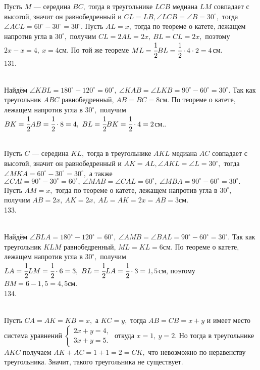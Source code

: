Пусть $M$ --- середина $BC,$ тогда в треугольнике $LCB$ медиана $LM$ совпадает с высотой, значит он равнобедренный и  $CL=LB, \angle LCB=\angle B=30^\circ,$ тогда $\angle ACL=60^\circ-30^\circ=30^\circ.$ Пусть $AL=x,$ тогда по теореме о катете, лежащем напротив угла в $30^\circ,$ получим $CL=2AL=2x,\ BL=CL=2x,$ поэтому $2x-x=4,\ x=4$см. По той же теореме $ML=\cfrac{1}{2}BL=\cfrac{1}{2}\cdot4\cdot2=4$см.\\
131. \begin{figure}[ht!]
\end{figure}\\
Найдём $\angle KBL=180^\circ-120^\circ=60^\circ,\ \angle KAB=\angle LKB=90^\circ-60^\circ=30^\circ.$ Так как треугольник $ABC$ равнобедренный, $AB=BC=8$см. По теореме о катете, лежащем напротив угла в $30^\circ,$ получим $BK=\cfrac{1}{2}AB=\cfrac{1}{2}\cdot8=4,\ BL=\cfrac{1}{2}BK=\cfrac{1}{2}\cdot4=2$см.\newpage{}. \begin{figure}[ht!]
\end{figure}\\
Пусть $C$ --- середина $KL,$ тогда в треугольнике $AKL$ медиана $AC$ совпадает с высотой, значит он равнобедренный и  $AK=AL, \angle AKL=\angle L=30^\circ,$ тогда $\angle MKA=60^\circ-30^\circ=30^\circ,$ а также $\angle CAl=90^\circ-30^\circ=60^\circ,\ \angle MAB=\angle CAL=60^\circ,\ \angle MBA=90^\circ-60^\circ=30^\circ.$
Пусть $AM=x,$ тогда по теореме о катете, лежащем напротив угла в $30^\circ,$ получим $AB=2x,\ AK=2x,\ AL=AK=2x=AB=3$см.\\
133. \begin{figure}[ht!]
\end{figure}\\
Найдём $\angle BLA=180^\circ-120^\circ=60^\circ,\ \angle AMB=\angle BAL=90^\circ-60^\circ=30^\circ.$ Так как треугольник $KLM$ равнобедренный, $ML=KL=6$см. По теореме о катете, лежащем напротив угла в $30^\circ,$ получим $LA=\cfrac{1}{2}LM=\cfrac{1}{2}\cdot6=3,\ BL=\cfrac{1}{2}LA=\cfrac{1}{2}\cdot3=1,5$см, поэтому $BM=6-1,5=4,5$см.\\
134. \begin{figure}[ht!]
\end{figure}\\
Пусть $CA=AK=KB=x,$ а $KC=y,$ тогда $AB=CB=x+y$ и имеет место система уравнений $\begin{cases} 2x+y=4,\\ 3x+y=5.\end{cases}$ откуда $x=1,\ y=2.$ Но тогда в треугольнике $AKC$ получаем $AK+AC=1+1=2=CK,$ что невозможно по неравенству треугольника. Значит, такого треугольника не существует.\newpage\noindent
